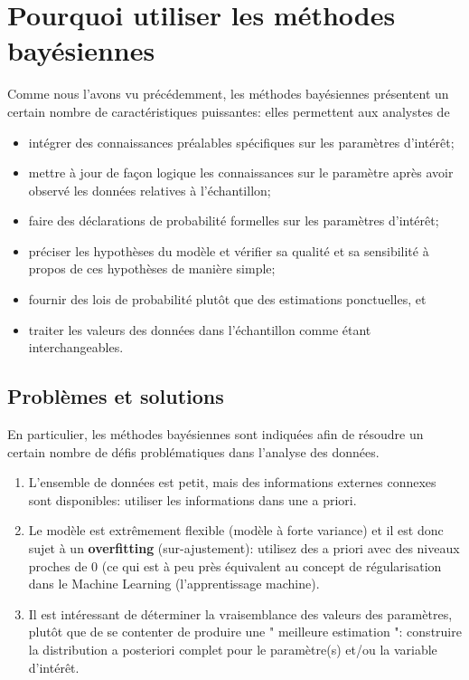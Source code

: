 \section{Pourquoi utiliser les m\'ethodes bay\'esiennes}
Comme nous l'avons vu pr\'ec\'edemment, les m\'ethodes bay\'esiennes pr\'esentent un certain nombre de caract\'eristiques puissantes: elles permettent aux analystes de
\begin{itemize}[noitemsep]
	\item int\'egrer des connaissances pr\'ealables sp\'ecifiques sur les param\`etres d'int\'erêt;
  \item mettre \`a jour de façon logique les connaissances sur le param\`etre apr\`es avoir observ\'e les donn\'ees relatives \`a l'\'echantillon;
  \item faire des d\'eclarations de probabilit\'e formelles sur les param\`etres d'int\'erêt;
  \item pr\'eciser les hypoth\`eses du mod\`ele et v\'erifier sa qualit\'e et sa sensibilit\'e \`a propos de ces hypoth\`eses de mani\`ere simple;
  \item fournir des lois de probabilit\'e plutôt que des estimations ponctuelles, et 
  \item traiter les valeurs des donn\'ees dans l'\'echantillon comme \'etant interchangeables. 
\end{itemize} 

\subsection{Probl\`emes et solutions}
En particulier, les m\'ethodes bay\'esiennes sont indiqu\'ees afin de r\'esoudre un certain nombre de d\'efis probl\'ematiques dans l'analyse des donn\'ees.
\begin{enumerate}
\item L'ensemble de donn\'ees est petit, mais des informations externes connexes sont disponibles: utiliser les informations dans une a priori. 
\item Le mod\`ele est extrêmement flexible (mod\`ele \`a forte variance) et il est donc sujet \`a un \textbf{overfitting} (sur-ajustement): utilisez des a priori avec des niveaux proches de 0 (ce qui est \`a peu pr\`es \'equivalent au concept de r\'egularisation dans le Machine Learning (l'apprentissage machine).
\item Il est int\'eressant de d\'eterminer la vraisemblance des valeurs des param\`etres, plutôt que de se contenter de produire une " meilleure estimation ": construire la distribution a posteriori complet pour le param\`etre(s) et/ou la variable d'int\'erêt. 
\end{enumerate}

